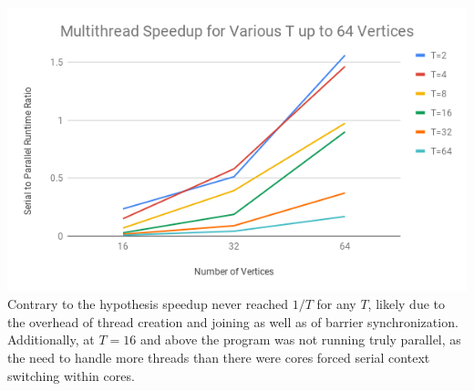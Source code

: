 \documentclass{article}
\begin{document}
\begin{adjustwidth}{-2cm}{-2cm}
\includegraphics[width=\linewidth]{speeduplim.png}\\
Contrary to the hypothesis speedup never reached $1/T$ for any $T$, likely due to the overhead of thread creation and joining as well as of barrier synchronization. Additionally, at $T=16$ and above the program was not running truly parallel, as the need to handle more threads than there were cores forced serial context switching within cores.
\end{adjustwidth}
\end{document}
